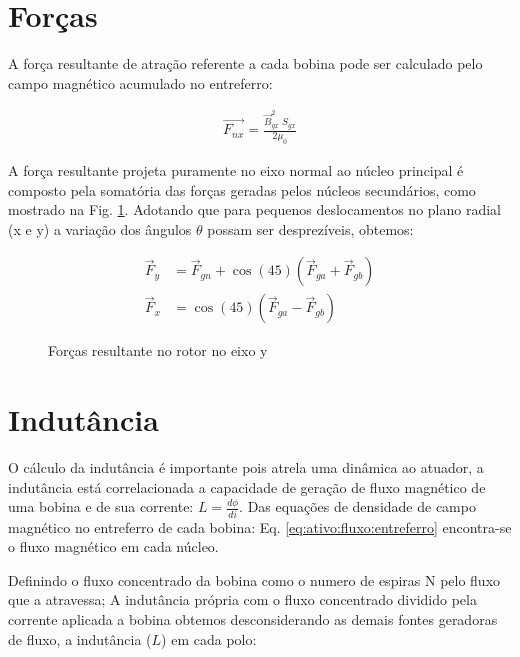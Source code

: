 \section{Forças}

A força resultante de atração referente  a cada bobina pode ser calculado pelo campo magnético acumulado no entreferro:

\begin{align}
	\vec{F_{nx}} = \frac{\vec{B}_{gx}^2 \; S_{gx}}{2 \mu_0} 
\end{align}

A força resultante projeta puramente no eixo normal ao núcleo principal é composto pela somatória das forças geradas pelos núcleos secundários, como mostrado na Fig. \ref{Fig:modelo:circuito:ativo:forcas}. Adotando que para pequenos deslocamentos no plano radial (x e y) a variação dos ângulos $\theta$ possam ser desprezíveis, obtemos:

\begin{align}
\vec{F}_y &= \vec{F}_{gn} + \cos(45) (\vec{F}_{ga} + \vec{F}_{gb}) \label{eq:ativo:F:resultante:y} \\
\vec{F}_x &= \cos(45) (\vec{F}_{ga} - \vec{F}_{gb})  \label{eq:ativo:F:resultante:x}
\end{align}

\begin{figure}[!ht]
	\centering
	\def\svgwidth{0.8\columnwidth}
	
		\caption{Forças resultante no rotor no eixo y}
		\label{Fig:modelo:circuito:ativo:forcas}
\end{figure} 


\section{Indutância} \label{subsec:at:indutancia}

O cálculo da indutância é importante pois atrela uma dinâmica ao atuador, a indutância está correlacionada a capacidade de geração de fluxo magnético de uma bobina e de sua corrente: $L = \frac {d\phi}{di}$. Das equações de densidade de campo magnético no entreferro de cada bobina:  Eq. \eqref{eq:ativo:fluxo:entreferro} encontra-se o fluxo magnético em cada núcleo.

Definindo o fluxo concentrado da bobina como o numero de espiras N pelo fluxo que a atravessa; A indutância própria com o  fluxo concentrado dividido pela corrente aplicada a bobina obtemos desconsiderando as demais fontes geradoras de fluxo, a indutância ($L$) em cada polo:

